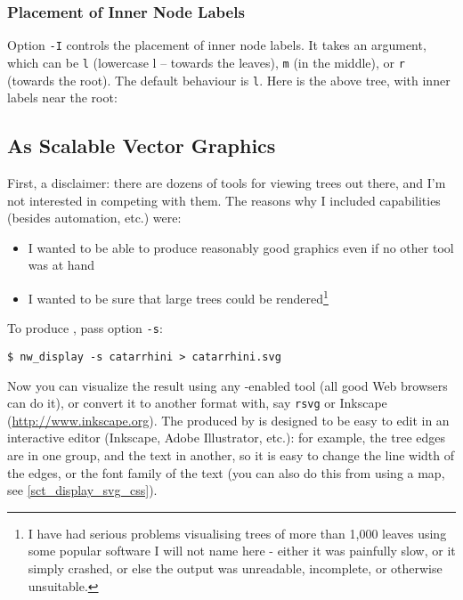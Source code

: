 \subsubsection{Placement of Inner Node Labels}

Option \texttt{-I} controls the placement of inner node labels. It takes an
argument, which can be \texttt{l} (lowercase l -- towards the leaves),
\texttt{m} (in the middle), or \texttt{r} (towards the root). The default
behaviour is \texttt{l}.  Here is the above tree, with inner labels near the
root:


\begin{samepage}

\end{samepage}

\subsection[As SVG]{As Scalable Vector Graphics}
\label{sct_display_svg}

First, a disclaimer: there are dozens of tools for viewing trees out there, and
I'm not interested in competing with them. The reasons why I included \svg{}
capabilities (besides automation, etc.) were:
\begin{itemize}
\item I wanted to be able to produce reasonably good graphics even if no other
tool was at hand
\item I wanted to be sure that large trees could be rendered\footnote{I have
had serious problems visualising trees of more than 1,000 leaves using some
popular software I will not name here - either it was painfully slow, or it
simply crashed, or else the output was unreadable, incomplete, or otherwise
unsuitable.}
\end{itemize}
To produce \svg, pass option \texttt{-s}:
\begin{verbatim}
$ nw_display -s catarrhini > catarrhini.svg
\end{verbatim}
Now you can visualize the result using any \svg-enabled tool (all good Web
browsers can do it), or convert it to another format with, say \texttt{rsvg} or
Inkscape (\url{http://www.inkscape.org}).  The \svg{} produced by \display{} is
designed to be easy to edit in an interactive editor (Inkscape, Adobe
Illustrator, etc.): for example, the tree edges are in one group, and the text
in another, so it is easy to change the line width of the edges, or the font
family of the text (you can also do this from \display{} using a \css{} map,
see \ref{sct_display_svg_css}).

